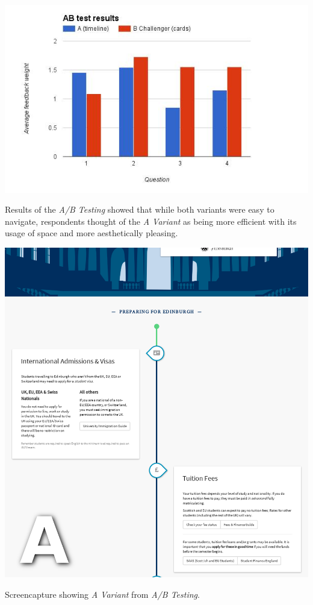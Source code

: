 \documentclass[a4paper, notoc]{tufte-handout}
\begin{document}
\begin{marginfigure}
  \includegraphics[width=\linewidth]{abresults.png}
  \caption{
    \label{fig:abresults}
    Results of the \textit{A/B Testing} showed that while both variants were easy to navigate, 
    respondents thought of the \textit{A Variant} as being more efficient with its usage of space 
    and more aesthetically pleasing.
  }
\end{marginfigure}


\begin{marginfigure}
  \includegraphics[width=\linewidth]{avariant.png}
  \caption{
    \label{fig:avariant}
    Screencapture showing \textit{A Variant} from \textit{A/B Testing}.
  }

\end{marginfigure}
\end{document}
